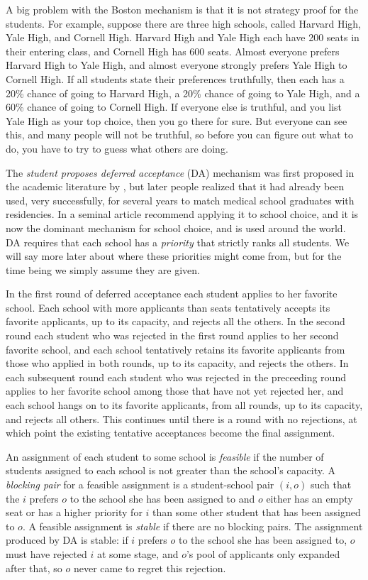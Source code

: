\documentclass[12pt]{article}
\theoremstyle{definition}
\begin{document}
A big problem with the Boston mechanism is that it is not strategy
proof for the students.  For example, suppose there are three high
schools, called Harvard High, Yale High, and Cornell High.  Harvard
High and Yale High each have 200 seats in their entering class, and
Cornell High has 600 seats.  Almost everyone prefers Harvard High to
Yale High, and almost everyone strongly prefers Yale High to Cornell
High.  If all students state their preferences truthfully, then each
has a 20\% chance of going to Harvard High, a 20\% chance of going to
Yale High, and a 60\% chance of going to Cornell High.  If everyone
else is truthful, and you list Yale High as your top choice, then you
go there for sure.  But everyone can see this, and many people will
not be truthful, so before you can figure out what to do, you have to
try to guess what others are doing.

The \emph{student proposes deferred acceptance} (DA) mechanism was
first proposed in the academic literature by \cite{GaSh62}, but
later people realized that it had already been used, very
successfully, for several years to match medical school graduates with
residencies.  In a seminal article \cite{as03aer} recommend applying it
to school choice, and it is now the dominant mechanism for school
choice, and is used around the world.  DA requires that each school
has a \emph{priority} that strictly ranks all students.  We will say more
later about where these priorities might come from, but for the time
being we simply assume they are given.

In the first round of deferred acceptance each student applies to her
favorite school.  Each school with more applicants than seats
tentatively accepts its favorite applicants, up to its capacity, and
rejects all the others.  In the second round each student who was
rejected in the first round applies to her second favorite school, and
each school tentatively retains its favorite applicants from those who
applied in both rounds, up to its capacity, and rejects the others.
In each subsequent round each student who was rejected in the
preceeding round applies to her favorite school among those that have
not yet rejected her, and each school hangs on to its favorite
applicants, from all rounds, up to its capacity, and rejects all
others.  This continues until there is a round with no rejections, at
which point the existing tentative acceptances become the final assignment.

An assignment of each student to some school is \emph{feasible} if the
number of students assigned to each school is not greater than the
school's capacity.  A \emph{blocking pair} for a feasible assignment
is a student-school pair $(i,o)$ such that the $i$ prefers $o$ to the
school she has been assigned to and $o$ either has an empty seat or
has a higher priority for $i$ than some other student that has been
assigned to $o$.  A feasible assignment is \emph{stable} if there are
no blocking pairs.  The assignment produced by DA is stable: if $i$ prefers
$o$ to the school she has been assigned to, $o$ must have rejected $i$
at some stage, and $o$'s pool of applicants only expanded after that,
so $o$ never came to regret this rejection.
\end{document}
